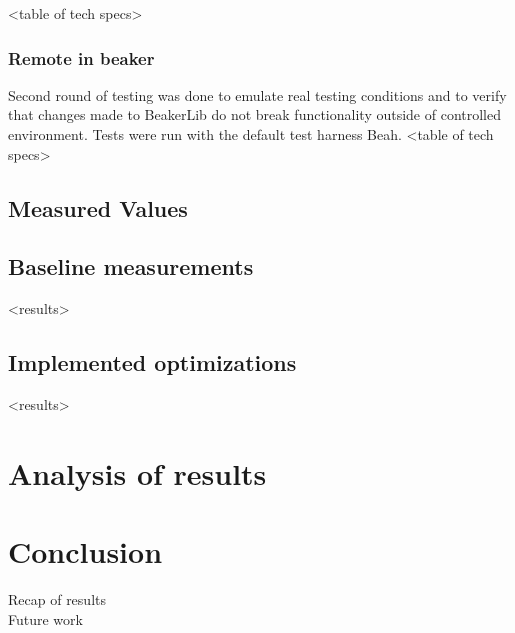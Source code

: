 <table of tech specs>

\subsection{Remote in beaker}
Second round of testing was done to emulate real testing conditions and to verify that changes made to BeakerLib do not break functionality outside of controlled environment. Tests were run with the default test harness Beah.
<table of tech specs>

\section{Measured Values}

\section{Baseline measurements}
<results>


\section{Implemented optimizations}
<results>

\chapter{Analysis of results}
\label{results}

\chapter{Conclusion}
\label{conclusion}
Recap of results
\\
Future work


